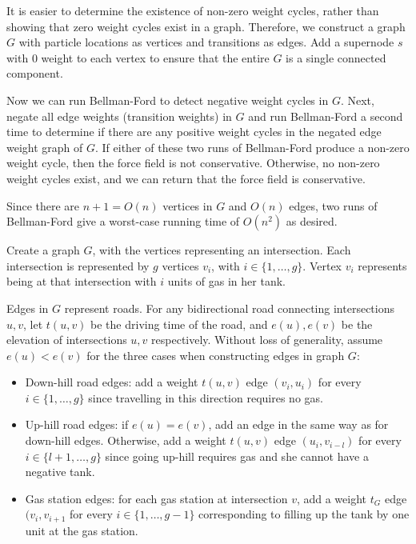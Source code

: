 \documentclass[12pt,twoside]{article}
\begin{document}
\begin{problems}
\newpage
\problem  %
It is easier to determine the existence of non-zero weight cycles, rather than showing that zero weight cycles exist in a graph. Therefore, we construct a graph $G$ with particle locations as vertices and transitions as edges. Add a supernode $s$ with 0 weight to each vertex to ensure that the entire $G$ is a single connected component. 

Now we can run Bellman-Ford to detect negative weight cycles in $G$. Next, negate all edge weights (transition weights) in $G$ and run Bellman-Ford a second time to determine if there are any positive weight cycles in the negated edge weight graph of $G$. If either of these two runs of Bellman-Ford produce a non-zero weight cycle, then the force field is not conservative. Otherwise, no non-zero weight cycles exist, and we can return that the force field is conservative.

Since there are $n+1=O(n)$ vertices in $G$ and $O(n)$ edges, two runs of Bellman-Ford give a worst-case running time of $O(n^2)$ as desired.

\newpage
\problem  %
Create a graph $G$, with the vertices representing an intersection. Each intersection is represented by $g$ vertices $v_i$, with $i \in \{1,\ldots,g\}$. Vertex $v_i$ represents being at that intersection with $i$ units of gas in her tank.

Edges in $G$ represent roads. For any bidirectional road connecting intersections $u,v$, let $t(u,v)$ be the driving time of the road, and $e(u),e(v)$ be the elevation of intersections $u,v$ respectively. Without loss of generality, assume $e(u) < e(v)$ for the three cases when constructing edges in graph $G$:
\begin{itemize}
    \item Down-hill road edges: add a weight $t(u,v)$ edge $(v_i,u_i)$ for every $i \in \{1,\ldots,g\}$ since travelling in this direction requires no gas.
    \item Up-hill road edges: if $e(u)=e(v)$, add an edge in the same way as for down-hill edges. Otherwise, add a weight $t(u,v)$ edge $(u_i,v_{i-l})$ for every $i \in \{l+1,\ldots,g\}$ since going up-hill requires gas and she cannot have a negative tank.
    \item Gas station edges: for each gas station at intersection $v$, add a weight $t_G$ edge $(v_i, v_{i+1}$ for every $i \in \{1,\ldots,g-1\}$ corresponding to filling up the tank by one unit at the gas station.
\end{itemize}


\end{problems}
\end{document}
